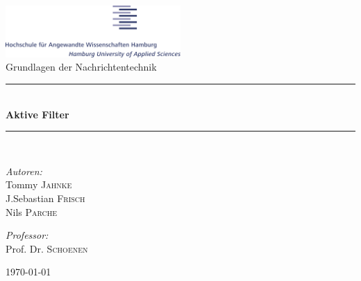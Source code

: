 \documentclass[12pt, a4paper]{article}
\begin{document}
	
	\begin{titlepage}
		
		\begin{center}
			
			\includegraphics[width=0.5\textwidth]{HawLogo.png}
			\\[1.5cm]
			\LARGE Grundlagen der Nachrichtentechnik
			
			\newcommand{\HRule}{\rule{\linewidth}{0.5 mm}}
			\HRule \\[0.3cm]
			{\huge \bfseries Aktive Filter} \\[0.3cm]
			\HRule \\[1.5cm]
			
			\begin{minipage}{0.4\textwidth}
				\begin{flushleft}
					\large \emph{Autoren:}\\
					Tommy \textsc{Jahnke}\\
					J.Sebastian \textsc{Frisch}\\
					Nils \textsc{Parche}
				\end{flushleft}
			\end{minipage}
			\hfill
			\begin{minipage}{0.4\textwidth}
				\begin{flushright}
					\large \emph{Professor:}\\
					Prof. Dr. \textsc{Schoenen}
					
				\end{flushright}
			\end{minipage}
			
			\vfill
			
			{\large \today}
		\end{center}
		
	\end{titlepage}
	
	\newpage
	\setcounter{page}{1}
	\listoffigures
	
\end{document}
